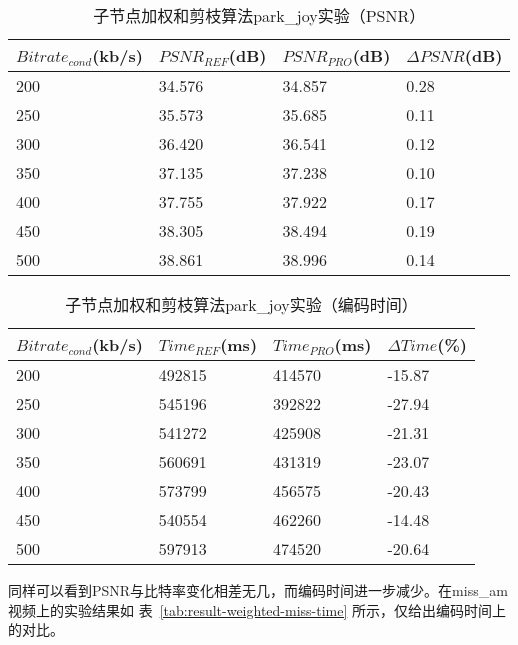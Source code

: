 \begin{table}[H]
  \centering
    \caption{子节点加权和剪枝算法park\_joy实验（PSNR）}
    \label{tab:result-weighted-park-psnr}
    \begin{tabularx}{\linewidth}{XXXX}
      \toprule[1.5pt]
      $Bitrate_{cond}$(kb/s) & $PSNR_{REF}$(dB) & $PSNR_{PRO}$(dB) & $\Delta PSNR$(dB) \\
      \midrule[1pt]
      200 & 34.576 & 34.857 & 0.28  \\
      250 & 35.573 & 35.685 & 0.11 \\
      300 & 36.420 & 36.541 & 0.12  \\
      350 & 37.135 & 37.238 & 0.10 \\
      400 & 37.755 & 37.922 & 0.17  \\
      450 & 38.305 & 38.494 & 0.19 \\
      500 & 38.861 & 38.996 & 0.14  \\
      \bottomrule[1.5pt]
    \end{tabularx}
\end{table}

\begin{table}[H]
  \centering
    \caption{子节点加权和剪枝算法park\_joy实验（编码时间）}
    \label{tab:result-weighted-park-time}
    \begin{tabularx}{\linewidth}{XXXX}
      \toprule[1.5pt]
      $Bitrate_{cond}$(kb/s) & $Time_{REF}$(ms) & $Time_{PRO}$(ms) & $\Delta Time$(\%) \\
      \midrule[1pt]
      200 & 492815 & 414570 & -15.87  \\
      250 & 545196 & 392822 & -27.94 \\
      300 & 541272 & 425908 & -21.31  \\
      350 & 560691 & 431319 & -23.07 \\
      400 & 573799 & 456575 & -20.43  \\
      450 & 540554 & 462260 & -14.48 \\
      500 & 597913 & 474520 & -20.64  \\
      \bottomrule[1.5pt]
    \end{tabularx}
\end{table}

同样可以看到PSNR与比特率变化相差无几，而编码时间进一步减少。在miss\_am视频上的实验结果如
表~\ref{tab:result-weighted-miss-time} 所示，仅给出编码时间上的对比。

